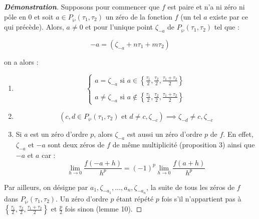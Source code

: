 \documentclass[12pt]{article}
\begin{document}
                    \begin{proof}[\textbf{Démonstration}]
                    Supposons pour commencer que \(f\) est paire et n'a ni zéro ni pôle en 0 et soit \(a \in P_{\wp}(\tau_1, \tau_2)\) un zéro de la fonction \(f\) (un tel \(a\) existe par ce qui précède). Alors, \(a \neq 0\) et pour l'unique point \(\zeta_{- a}\) de \(P_{\wp}(\tau_1, \tau_2)\) tel que :

                    \[
                    -a = (\zeta_{- a} + n\tau_1 + m\tau_2)
                    \]

                    on a alors :

                    \begin{enumerate}
                        \item
                        \[
                        \left\{
                        \begin{array}{ll}
                            a = \zeta_{-a} \text{ si } a \in \left\{\frac{\tau_1}{2}, \frac{\tau_2}{2}, \frac{\tau_1 + \tau_2}{2}\right\} \\ \\
                            a \neq \zeta_{-a} \text{ si } a \notin \left\{\frac{\tau_1}{2}, \frac{\tau_2}{2}, \frac{\tau_1 + \tau_2}{2}\right\}
                        \end{array}
                        \right.
                        \]

                        \item
                        \[
                        (c, d \in P_{\wp}(\tau_1, \tau_2) \text{ et } d \neq c, \zeta_{-c}) \implies \zeta_{-d} \neq c, \zeta_{-c}
                        \]

                        \item Si \(a\) est un zéro d'ordre \(p\), alors \(\zeta_{-a}\) est aussi un zéro d'ordre \(p\) de \(f\). En effet, \(\zeta_{-a}\) et \(-a\) sont deux zéros de \(f\) de même multiplicité (proposition 3) ainsi que \(-a\) et \(a\) car :
                        \[
                        \lim_{h \to 0} \frac{f(-a + h)}{h^p} = (-1)^p \lim_{h \to 0} \frac{f(a + h)}{h^p}
                        \]
                    \end{enumerate}

                    Par ailleurs, on désigne par \(a_1, \zeta_{-a_1}, \ldots, a_n, \zeta_{-a_n}\), la suite de tous les zéros de \(f\) dans \(P_{\wp}(\tau_1, \tau_2)\). Un zéro d'ordre \(p\) étant répété \(p\) fois s'il n'appartient pas à \(\left\{ \frac{\tau_1}{2}, \frac{\tau_2}{2}, \frac{\tau_1 + \tau_2}{2} \right\} \text{ et } \frac{p}{2}\) fois sinon (lemme 10).


\end{proof}
\end{document}
